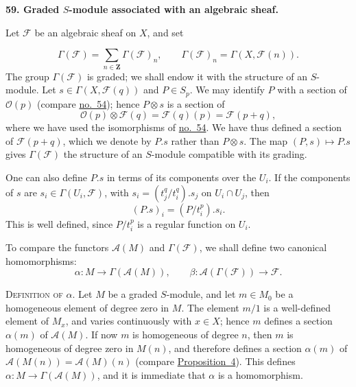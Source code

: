 
\label{fac:III:2:no:59}
\textbf{59. Graded $S$-module associated with an algebraic sheaf.}

Let $\mathcal{F}$ be an algebraic sheaf on $X$, and set

\label{fac:III:2:no:59:formula:graded-sections}
\[
\Gamma(\mathcal{F})=
\sum_{n\in\mathbf{Z}}\Gamma(\mathcal{F})_n,
\qquad
\Gamma(\mathcal{F})_n=\Gamma(X,\mathcal{F}(n)).
\]
The group $\Gamma(\mathcal{F})$ is graded; we shall endow it with the
structure of an $S$-module. Let $s\in\Gamma(X,\mathcal{F}(q))$ and
$P\in S_p$. We may identify $P$ with a section of $\mathcal{O}(p)$
(compare \hyperref[fac:III:2:no:54]{no.~54}); hence $P\otimes s$ is a
section of
\label{fac:III:2:no:59:formula:S-action}
\[
\mathcal{O}(p)\otimes\mathcal{F}(q)
=\mathcal{F}(q)(p)=\mathcal{F}(p+q),
\]
where we have used the isomorphisms of
\hyperref[fac:III:2:no:54]{no.~54}. We have thus defined a
section of $\mathcal{F}(p+q)$, which we denote by $P.s$ rather than
$P\otimes s$. The map $(P,s)\mapsto P.s$ gives
$\Gamma(\mathcal{F})$ the structure of an $S$-module compatible with
its grading.

One can also define $P.s$ in terms of its components over the $U_i$.
If the components of $s$ are
$s_i\in\Gamma(U_i,\mathcal{F})$, with
$s_i=(t_j^q/t_i^q).s_j$ on $U_i\cap U_j$, then
\label{fac:III:2:no:59:formula:component-action}
\[
(P.s)_i=(P/t_i^p).s_i.
\]
This is well defined, since $P/t_i^p$ is a regular function on $U_i$.

To compare the functors $\mathcal{A}(M)$ and $\Gamma(\mathcal{F})$, we
shall define two canonical homomorphisms:
\label{fac:III:2:no:59:formula:alpha-beta}
\[
\alpha:M\longrightarrow\Gamma(\mathcal{A}(M)),
\qquad
\beta:\mathcal{A}(\Gamma(\mathcal{F}))\longrightarrow\mathcal{F}.
\]

\label{fac:III:2:no:59:def:alpha}
\textsc{Definition of $\alpha$.}
Let $M$ be a graded $S$-module, and let $m\in M_0$ be a homogeneous
element of degree zero in $M$. The element $m/1$ is a well-defined
element of $M_x$, and varies continuously with $x\in X$; hence $m$
defines a section $\alpha(m)$ of $\mathcal{A}(M)$. If now $m$ is
homogeneous of degree $n$, then $m$ is homogeneous of degree zero in
$M(n)$, and therefore defines a section $\alpha(m)$ of
$\mathcal{A}(M(n))=\mathcal{A}(M)(n)$ (compare
\hyperref[fac:III:2:no:58:prop:4]{Proposition~4}). This defines
$\alpha:M\to\Gamma(\mathcal{A}(M))$, and it is immediate that $\alpha$
is a homomorphism.

